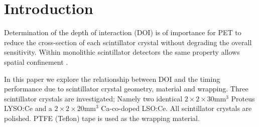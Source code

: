 \section{Introduction} 
Determination of the depth of interaction (DOI) is of importance for PET to reduce the cross-section of each scintillator crystal without degrading the overall sensitivity\cite{Moses_2001}\cite{Humm_Rosenfeld_Del_Guerra_2003}. Within monolithic scintillator detectors the same property allows spatial confinement \cite{am_Borghi_Seifert_Schaart_2013}\cite{Maas_Bruyndonckx_Schaart_2012}.\cite{Payne_Choong_Hull_Reutter_2008}

In this paper we explore the relationship between DOI and the timing performance due to scintillator crystal geometry, material and wrapping. Three scintillator crystals are investigated; Namely two identical $2\times2\times30$mm$^3$ Proteus LYSO:Ce and a $2\times2\times20$mm$^3$ Ca-co-doped LSO:Ce. All scintillator crystals are polished. PTFE (Teflon) tape is used as the wrapping material.

